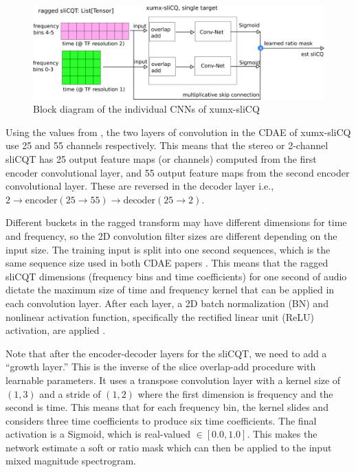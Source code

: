\documentclass[report.tex]{subfiles}
\begin{document}
\begin{figure}[ht]
	\centering
	\includegraphics[width=\textwidth]{./images-blockdiagrams/xumx_slicq_pertarget_largefont.png}
	\caption{Block diagram of the individual CNNs of xumx-sliCQ}
	\label{fig:cdaeslicqt}
\end{figure}

Using the values from \textcite{plumbley2}, the two layers of convolution in the CDAE of xumx-sliCQ use 25 and 55 channels respectively. This means that the stereo or 2-channel sliCQT has 25 output feature maps (or channels) computed from the first encoder convolutional layer, and 55 output feature maps from the second encoder convolutional layer. These are reversed in the decoder layer i.e., $2 \rightarrow \text{encoder}(25 \rightarrow 55) \rightarrow \text{decoder}(25 \rightarrow 2)$.

Different buckets in the ragged transform may have different dimensions for time and frequency, so the 2D convolution filter sizes are different depending on the input size. The training input is split into one second sequences, which is the same sequence size used in both CDAE papers \parencite{plumbley1, plumbley2}. This means that the ragged sliCQT dimensions (frequency bins and time coefficients) for one second of audio dictate the maximum size of time and frequency kernel that can be applied in each convolution layer. After each layer, a 2D batch normalization (BN) and nonlinear activation function, specifically the rectified linear unit (ReLU) activation, are applied \parencite{plumbley2}.

Note that after the encoder-decoder layers for the sliCQT, we need to add a ``growth layer.'' This is the inverse of the slice overlap-add procedure with learnable parameters. It uses a transpose convolution layer with a kernel size of $(1, 3)$ and a stride of $(1, 2)$ where the first dimension is frequency and the second is time. This means that for each frequency bin, the kernel slides and considers three time coefficients to produce six time coefficients. The final activation is a Sigmoid, which is real-valued $\in [0.0, 1.0]$. This makes the network estimate a soft or ratio mask which can then be applied to the input mixed magnitude spectrogram.
\end{document}
